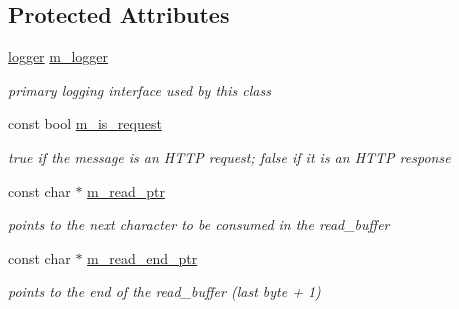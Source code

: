 \subsection*{Protected Attributes}
\begin{DoxyCompactItemize}
\item 
\hyperlink{structpion_1_1logger}{logger} \hyperlink{classpion_1_1http_1_1parser_ac0df021ba559d1af96dc9b0a5fa99df5}{m\-\_\-logger}
\begin{DoxyCompactList}\small\item\em primary logging interface used by this class \end{DoxyCompactList}\item 
const bool \hyperlink{classpion_1_1http_1_1parser_a5c24acf28ddd9c6133be4aa3127da530}{m\-\_\-is\-\_\-request}
\begin{DoxyCompactList}\small\item\em true if the message is an H\-T\-T\-P request; false if it is an H\-T\-T\-P response \end{DoxyCompactList}\item 
const char $\ast$ \hyperlink{classpion_1_1http_1_1parser_a3ca52095a690cb92197755a5eea24cd7}{m\-\_\-read\-\_\-ptr}
\begin{DoxyCompactList}\small\item\em points to the next character to be consumed in the read\-\_\-buffer \end{DoxyCompactList}\item 
const char $\ast$ \hyperlink{classpion_1_1http_1_1parser_a6788da854f2d77ae2c92c739d0a2c191}{m\-\_\-read\-\_\-end\-\_\-ptr}
\begin{DoxyCompactList}\small\item\em points to the end of the read\-\_\-buffer (last byte + 1) \end{DoxyCompactList}\end{DoxyCompactItemize}
